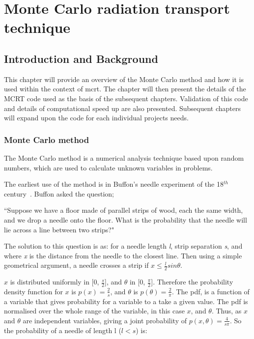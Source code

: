 \chapter{Monte Carlo radiation transport technique}

\section{Introduction and Background}
This chapter will provide an overview of the Monte Carlo method and how it is used within the context of \gls{mcrt}. The chapter will then present the details of the MCRT code used as the basis of the subsequent chapters. Validation of this code and details of computational speed up are also presented. Subsequent chapters will expand upon the code for each individual projects needs.

\subsection{Monte Carlo method}\label{sec:mcmethod}
The Monte Carlo method is a numerical analysis technique based upon random numbers, which are used to calculate unknown variables in problems. 

The earliest use of the method is in Buffon's needle experiment of the 18$^{th}$ century~\cite{badger1994lazzarini,beckmann2015history,buffon1785histoire}. Buffon asked the question;

\medskip

``Suppose we have a floor made of parallel strips of wood, each the same width, and we drop a needle onto the floor. What is the probability that the needle will lie across a line between two strips?"

\medskip

The solution to this question is as:
for a needle length \textit{l}, strip separation \textit{s}, and where \textit{x} is the distance from the needle to the closest line. Then using a simple geometrical argument, a needle crosses a strip if $x \leq \tfrac{l}{2} sin \theta$.

$x$ is distributed uniformly in [0, $\tfrac{s}{2}$], and $\theta$ in [0, $\tfrac{\pi}{2}$]. Therefore the probability density function for $x$ is $p(x)=\tfrac{2}{s}$, and $\theta$ is $p(\theta) = \tfrac{2}{\pi}$. The \gls{pdf}, is a function of a variable that gives probability for a variable to a take a given value. The \gls{pdf} is normalised over the whole range of the variable, in this case $x$, and $\theta$.
Thus, as $x$ and $\theta$ are independent variables, giving a joint probability of $p(x,\theta) = \tfrac{4}{s \pi}$.
So the probability of a needle of length l ($l<s$) is:

